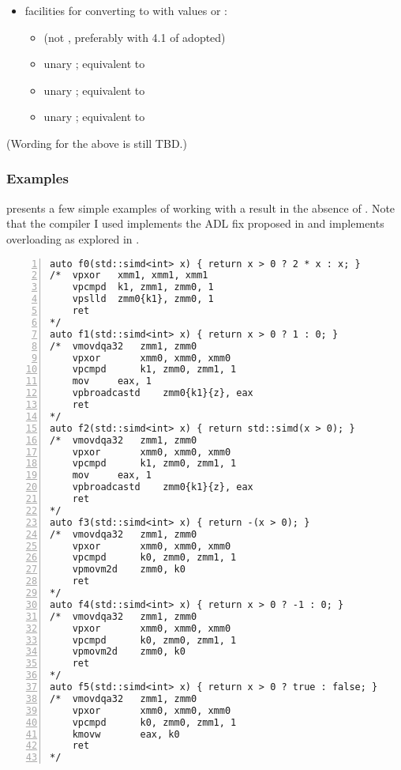 \begin{itemize}
  \item facilities for converting  to  with
    values  or :
    \begin{itemize}
      \item {} (not ,
        preferably with 4.1 of \cite{P2600R0} adopted)
      \item unary ; equivalent to 
      \item unary ; equivalent to 
      \item unary ; equivalent to 
    \end{itemize}
\end{itemize}

(Wording for the above is still TBD.)

\subsubsection{Examples}

 presents a few simple examples of working with a
 result in the absence of .
Note that the compiler I used implements the ADL fix proposed in \cite{P2600R0}
and implements  overloading as explored in \cite{D0917}.

\begin{lstlisting}[numbers=left,float={hbtp},label=lst:simdconditionals,caption={
    \code{simd} conditionals without \code{where} and with \cite{P2600R0} and \cite{D0917}, showing the corresponding assembly output (\code{gcc -O2 -std=c++23 -march=skylake-avx512}; personal GCC 12.1 branch with patches implementing \cite{P2600R0} and \cite{D0917})
}]
auto f0(std::simd<int> x) { return x > 0 ? 2 * x : x; }
/*	vpxor	xmm1, xmm1, xmm1
	vpcmpd	k1, zmm1, zmm0, 1
	vpslld	zmm0{k1}, zmm0, 1
	ret
*/
auto f1(std::simd<int> x) { return x > 0 ? 1 : 0; }
/*	vmovdqa32	zmm1, zmm0
	vpxor		xmm0, xmm0, xmm0
	vpcmpd		k1, zmm0, zmm1, 1
	mov		eax, 1
	vpbroadcastd	zmm0{k1}{z}, eax
	ret
*/
auto f2(std::simd<int> x) { return std::simd(x > 0); }
/*	vmovdqa32	zmm1, zmm0
	vpxor		xmm0, xmm0, xmm0
	vpcmpd		k1, zmm0, zmm1, 1
	mov		eax, 1
	vpbroadcastd	zmm0{k1}{z}, eax
	ret
*/
auto f3(std::simd<int> x) { return -(x > 0); }
/*	vmovdqa32	zmm1, zmm0
	vpxor		xmm0, xmm0, xmm0
	vpcmpd		k0, zmm0, zmm1, 1
	vpmovm2d	zmm0, k0
	ret
*/
auto f4(std::simd<int> x) { return x > 0 ? -1 : 0; }
/*	vmovdqa32	zmm1, zmm0
	vpxor		xmm0, xmm0, xmm0
	vpcmpd		k0, zmm0, zmm1, 1
	vpmovm2d	zmm0, k0
	ret
*/
auto f5(std::simd<int> x) { return x > 0 ? true : false; }
/*	vmovdqa32	zmm1, zmm0
	vpxor		xmm0, xmm0, xmm0
	vpcmpd		k0, zmm0, zmm1, 1
	kmovw		eax, k0
	ret
*/
\end{lstlisting}

